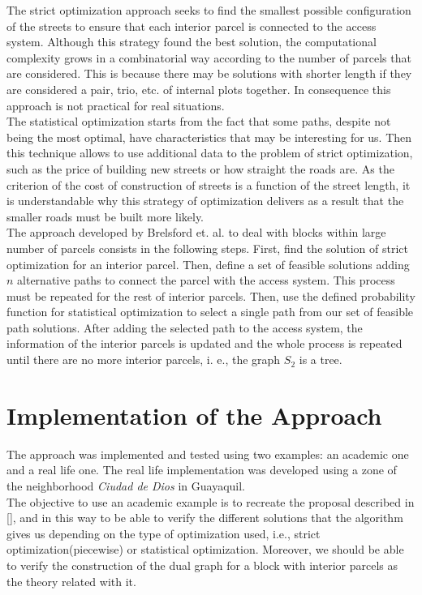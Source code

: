 \documentclass[10pt]{article}
\begin{document}
The strict optimization approach seeks to find the smallest possible configuration of the streets to ensure that each interior parcel is connected to the access system. Although this strategy found the best solution, the computational complexity grows in a combinatorial way according to the number of parcels that are considered. This is because there may be solutions with shorter length if they are considered a pair, trio, etc. of internal plots together. In consequence this approach is not practical for real situations.\\

The statistical optimization starts from the fact that some paths, despite not being the most optimal, have characteristics that may be interesting for us. Then this technique allows to use additional data to the problem of strict optimization, such as the price of building new streets or how straight the roads are. As the criterion of the cost of construction of streets is a function of the street length, it is understandable why this strategy of optimization delivers as a result that the smaller roads must be built more likely.\\

The approach developed by Brelsford et. al. to deal with blocks within large number of parcels consists in the following steps. First, find the solution of strict optimization for an interior parcel. Then, define a set of feasible solutions adding $n$ alternative paths to connect the parcel with the access system. This process must be repeated for the rest of interior parcels. Then, use the defined probability function for statistical optimization to select a single path from our set of feasible path solutions. After adding the selected path to the access system, the information of the interior parcels is updated and the whole process is repeated until there are no more interior parcels, i. e., the graph $ S_2 $ is a tree.

\section{Implementation of the Approach}
The approach was implemented and tested using two examples: an academic one and a real life one. The real life implementation was developed using a zone of the neighborhood \emph{Ciudad de Dios} in Guayaquil.\\

The objective to use an academic example is to recreate the proposal described in [], and in this way to be able to verify the different solutions that the algorithm gives us depending on the type of optimization used, i.e., strict optimization(piecewise) or statistical optimization. Moreover, we should be able to verify the construction of the dual graph for a block with interior parcels as the theory related with it.\\
\end{document}
